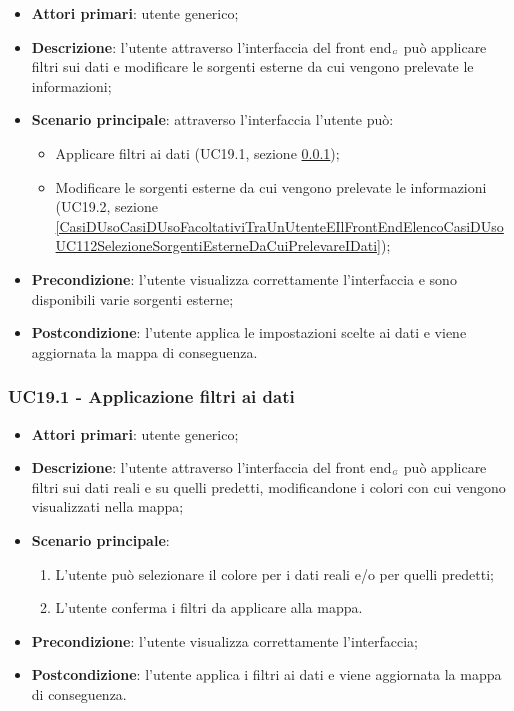 \begin{itemize}
	\item \textbf{Attori primari}: utente generico;
	\item \textbf{Descrizione}: l'utente attraverso l'interfaccia del front end$_{\scaleto{G}{3pt}}$ può applicare filtri sui dati e modificare le sorgenti esterne da cui vengono prelevate le informazioni;
	\item \textbf{Scenario principale}: attraverso l'interfaccia l'utente può:
	\begin{itemize}
		\item Applicare filtri ai dati (UC19.1, sezione  \ref{CasiDUsoCasiDUsoFacoltativiTraUnUtenteEIlFrontEndElencoCasiDUsoUC111ApplicazioneFiltriAiDati});
		\item Modificare le sorgenti esterne da cui vengono prelevate le informazioni (UC19.2, sezione \ref{CasiDUsoCasiDUsoFacoltativiTraUnUtenteEIlFrontEndElencoCasiDUsoUC112SelezioneSorgentiEsterneDaCuiPrelevareIDati});
	\end{itemize}
	\item \textbf{Precondizione}: l'utente visualizza correttamente l'interfaccia e sono disponibili varie sorgenti esterne;
	\item \textbf{Postcondizione}: l'utente applica le impostazioni scelte ai dati e viene aggiornata la mappa di conseguenza.
\end{itemize}

\subsubsection{UC19.1 - Applicazione filtri ai dati}\label{CasiDUsoCasiDUsoFacoltativiTraUnUtenteEIlFrontEndElencoCasiDUsoUC111ApplicazioneFiltriAiDati}
\begin{itemize}
	\item \textbf{Attori primari}: utente generico;
	\item \textbf{Descrizione}: l'utente attraverso l'interfaccia del front end$_{\scaleto{G}{3pt}}$ può applicare filtri sui dati reali e su quelli predetti, modificandone i colori con cui vengono visualizzati nella mappa;
	\item \textbf{Scenario principale}:
	\begin{enumerate}
		\item L'utente può selezionare il colore per i dati reali e/o per quelli predetti;
		\item L'utente conferma i filtri da applicare alla mappa.
	\end{enumerate}
	\item \textbf{Precondizione}: l'utente visualizza correttamente l'interfaccia;
	\item \textbf{Postcondizione}: l'utente applica i filtri ai dati e viene aggiornata la mappa di conseguenza.
\end{itemize}

